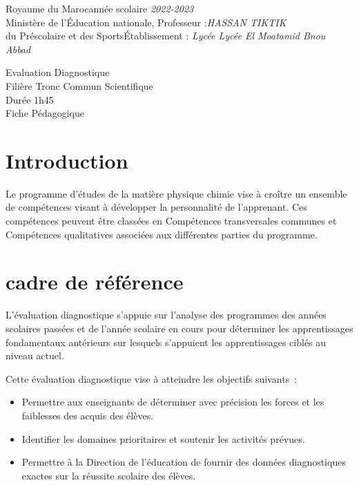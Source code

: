 \documentclass[12pt]{article}
\newcommand\headerMe[2]{\noindent{}#1\hfill#2}
\begin{document}
\headerMe{Royaume du Maroc}{année scolaire \emph{2022-2023}}\\
\headerMe{Ministère de l'Éducation nationale, }{  Professeur :\emph{HASSAN TIKTIK}}\\
\headerMe{du Préscolaire et des Sports}{Établissement : \emph{Lycée Lycée El Moatamid Bnou Abbad}}\\

\begin{center}
Evaluation Diagnostique \\
Filière Tronc Commun Scientifique\\
Durée 1h45
\\
    \vspace{.2cm}
\hrulefill
\Large{Fiche Pédagogique}
\hrulefill\\
\end{center}


\section[A]{Introduction }
\hspace{0.5cm}Le programme d'études de la matière physique chimie vise à croître un ensemble de compétences visant à développer la personnalité de l'apprenant. Ces compétences peuvent être classées en Compétences transversales communes et Compétences qualitatives associées aux différentes parties du programme.
\section{cadre de référence }
 \hspace{0.5cm}
L'évaluation diagnostique s'appuie sur l'analyse des programmes des années scolaires passées et de l'année scolaire en cours pour déterminer les apprentissages fondamentaux antérieurs sur lesquels s'appuient les apprentissages ciblés au niveau actuel.

Cette évaluation diagnostique vise à atteindre les objectifs suivants :
\begin{itemize}
	\item Permettre aux enseignants de déterminer avec précision les forces et les faiblesses des acquis des élèves.
	\item Identifier les domaines prioritaires et soutenir les activités prévues.
	\item Permettre à la Direction de l'éducation de fournir des données diagnostiques exactes sur la réussite scolaire des élèves.
\end{itemize}
\end{document}
